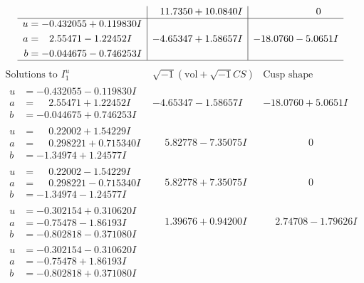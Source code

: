 \documentclass[1p]{elsarticle_modified}
\theoremstyle{definition}
\newcommand{\I}{\sqrt{-1}}
\begin{document}
$$\begin{array}{c|c|c}
 & \phantom{-}11.7350 + 10.0840 I & \phantom{-0.000000 } 0 \\ \hline\begin{aligned}
u &= -0.432055 + 0.119830 I \\
a &= \phantom{-}2.55471 - 1.22452 I \\
b &= -0.044675 - 0.746253 I\end{aligned}
 & -4.65347 + 1.58657 I & -18.0760 - 5.0651 I\\
 \hline 
 \end{array}$$\newpage$$\begin{array}{c|c|c}  
\text{Solutions to }I^u_{1}& \I (\text{vol} + \sqrt{-1}CS) & \text{Cusp shape}\\
 \hline 
\begin{aligned}
u &= -0.432055 - 0.119830 I \\
a &= \phantom{-}2.55471 + 1.22452 I \\
b &= -0.044675 + 0.746253 I\end{aligned}
 & -4.65347 - 1.58657 I & -18.0760 + 5.0651 I \\ \hline\begin{aligned}
u &= \phantom{-}0.22002 + 1.54229 I \\
a &= \phantom{-}0.298221 + 0.715340 I \\
b &= -1.34974 + 1.24577 I\end{aligned}
 & \phantom{-}5.82778 - 7.35075 I & \phantom{-0.000000 } 0 \\ \hline\begin{aligned}
u &= \phantom{-}0.22002 - 1.54229 I \\
a &= \phantom{-}0.298221 - 0.715340 I \\
b &= -1.34974 - 1.24577 I\end{aligned}
 & \phantom{-}5.82778 + 7.35075 I & \phantom{-0.000000 } 0 \\ \hline\begin{aligned}
u &= -0.302154 + 0.310620 I \\
a &= -0.75478 - 1.86193 I \\
b &= -0.802818 - 0.371080 I\end{aligned}
 & \phantom{-}1.39676 + 0.94200 I & \phantom{-}2.74708 - 1.79626 I \\ \hline\begin{aligned}
u &= -0.302154 - 0.310620 I \\
a &= -0.75478 + 1.86193 I \\
b &= -0.802818 + 0.371080 I\end{aligned}

\end{array}$$
\end{document}
